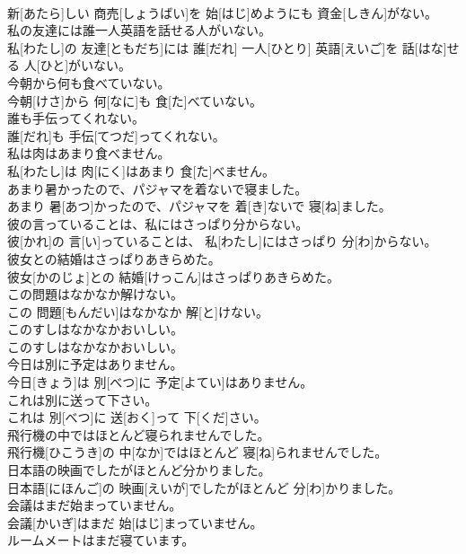 \documentclass[8pt]{extreport}
\begin{document}
\begin{CJK}{UTF8}{min}
\\	新[あたら]しい 商売[しょうばい]を 始[はじ]めようにも 資金[しきん]がない。
\\	私の友達には誰一人英語を話せる人がいない。	
\\	私[わたし]の 友達[ともだち]には 誰[だれ] 一人[ひとり] 英語[えいご]を 話[はな]せる 人[ひと]がいない。
\\	今朝から何も食べていない。	
\\	今朝[けさ]から 何[なに]も 食[た]べていない。
\\	誰も手伝ってくれない。	
\\	誰[だれ]も 手伝[てつだ]ってくれない。
\\	私は肉はあまり食べません。	
\\	私[わたし]は 肉[にく]はあまり 食[た]べません。
\\	あまり暑かったので、パジャマを着ないで寝ました。	
\\	あまり 暑[あつ]かったので、パジャマを 着[き]ないで 寝[ね]ました。
\\	彼の言っていることは、私にはさっぱり分からない。	
\\	彼[かれ]の 言[い]っていることは、 私[わたし]にはさっぱり 分[わ]からない。
\\	彼女との結婚はさっぱりあきらめた。	
\\	彼女[かのじょ]との 結婚[けっこん]はさっぱりあきらめた。
\\	この問題はなかなか解けない。	
\\	この 問題[もんだい]はなかなか 解[と]けない。
\\	このすしはなかなかおいしい。	
\\	このすしはなかなかおいしい。
\\	今日は別に予定はありません。	
\\	今日[きょう]は 別[べつ]に 予定[よてい]はありません。
\\	これは別に送って下さい。	
\\	これは 別[べつ]に 送[おく]って 下[くだ]さい。
\\	飛行機の中ではほとんど寝られませんでした。	
\\	飛行機[ひこうき]の 中[なか]ではほとんど 寝[ね]られませんでした。
\\	日本語の映画でしたがほとんど分かりました。	
\\	日本語[にほんご]の 映画[えいが]でしたがほとんど 分[わ]かりました。
\\	会議はまだ始まっていません。	
\\	会議[かいぎ]はまだ 始[はじ]まっていません。
\\	ルームメートはまだ寝ています。	

\end{CJK}
\end{document}
